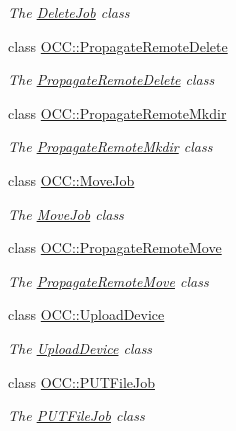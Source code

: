 \begin{DoxyCompactItemize}
\begin{DoxyCompactList}\small\item\em The \hyperlink{class_o_c_c_1_1_delete_job}{Delete\+Job} class \end{DoxyCompactList}\item 
class \hyperlink{class_o_c_c_1_1_propagate_remote_delete}{O\+C\+C\+::\+Propagate\+Remote\+Delete}
\begin{DoxyCompactList}\small\item\em The \hyperlink{class_o_c_c_1_1_propagate_remote_delete}{Propagate\+Remote\+Delete} class \end{DoxyCompactList}\item 
class \hyperlink{class_o_c_c_1_1_propagate_remote_mkdir}{O\+C\+C\+::\+Propagate\+Remote\+Mkdir}
\begin{DoxyCompactList}\small\item\em The \hyperlink{class_o_c_c_1_1_propagate_remote_mkdir}{Propagate\+Remote\+Mkdir} class \end{DoxyCompactList}\item 
class \hyperlink{class_o_c_c_1_1_move_job}{O\+C\+C\+::\+Move\+Job}
\begin{DoxyCompactList}\small\item\em The \hyperlink{class_o_c_c_1_1_move_job}{Move\+Job} class \end{DoxyCompactList}\item 
class \hyperlink{class_o_c_c_1_1_propagate_remote_move}{O\+C\+C\+::\+Propagate\+Remote\+Move}
\begin{DoxyCompactList}\small\item\em The \hyperlink{class_o_c_c_1_1_propagate_remote_move}{Propagate\+Remote\+Move} class \end{DoxyCompactList}\item 
class \hyperlink{class_o_c_c_1_1_upload_device}{O\+C\+C\+::\+Upload\+Device}
\begin{DoxyCompactList}\small\item\em The \hyperlink{class_o_c_c_1_1_upload_device}{Upload\+Device} class \end{DoxyCompactList}\item 
class \hyperlink{class_o_c_c_1_1_p_u_t_file_job}{O\+C\+C\+::\+P\+U\+T\+File\+Job}
\begin{DoxyCompactList}\small\item\em The \hyperlink{class_o_c_c_1_1_p_u_t_file_job}{P\+U\+T\+File\+Job} class \end{DoxyCompactList}\item 

\end{DoxyCompactItemize}
